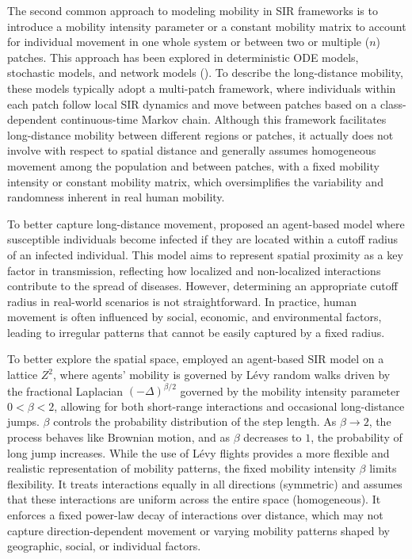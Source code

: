 \documentclass[sn-basic]{sn-jnl}%
\theoremstyle{thmstyleone}%
\theoremstyle{thmstyletwo}%
\theoremstyle{thmstylethree}%
\numberwithin{equation}{theorem}
\begin{document}
The second common approach to modeling mobility in SIR frameworks is to introduce a mobility intensity parameter or a constant mobility matrix to account for individual movement in one whole system or between two or multiple ($n$) patches.  This approach has been explored in deterministic ODE models, stochastic models, and network models (\citep{wang2003threshold,ahmed2012modeling,chen2014transmission,xie2023contact,ding2012global,bichara2015sis,akuno2023multi,nipa2020disease,abhishek2021epidemic}). To describe the long-distance mobility, these models typically adopt a multi-patch framework, where individuals within each patch follow local SIR dynamics and move between patches based on a class-dependent continuous-time Markov chain. Although this framework facilitates long-distance mobility between different regions or patches, it actually does not involve with respect to spatial distance and generally assumes homogeneous movement among the population and between patches, with a fixed mobility intensity or constant mobility matrix, which oversimplifies the variability and randomness inherent in real human mobility.

To better capture long-distance movement, \citep{centres2024diffusion} proposed an agent-based model where susceptible individuals become infected if they are located within a cutoff radius of an infected individual. This model aims to represent spatial proximity as a key factor in transmission, reflecting how localized and non-localized interactions contribute to the spread of diseases. However, determining an appropriate cutoff radius in real-world scenarios is not straightforward. In practice, human movement is often influenced by social, economic, and environmental factors, leading to irregular patterns that cannot be easily captured by a fixed radius. 

To better explore the spatial space, \citep{paoluzzi2021single} employed an agent-based SIR model on a lattice $Z^2$, where agents' mobility is governed by L\'{e}vy random walks driven by the fractional Laplacian $(-\Delta)^{\beta/2}$ governed by the mobility intensity parameter $0<\beta<2$, allowing for both short-range interactions and occasional long-distance jumps. $\beta$ controls the probability distribution of the step length. As $\beta\rightarrow 2$, the process behaves like Brownian motion, and as $\beta$ decreases to $1$, the probability of long jump increases. While the use of L\'{e}vy flights provides a more flexible and realistic representation of mobility patterns, the fixed mobility intensity $\beta$ limits flexibility. It treats interactions equally in all directions (symmetric) and assumes that these interactions are uniform across the entire space (homogeneous). It enforces a fixed power-law decay of interactions over distance, which may not capture direction-dependent movement or varying mobility patterns shaped by geographic, social, or individual factors.
\end{document}
